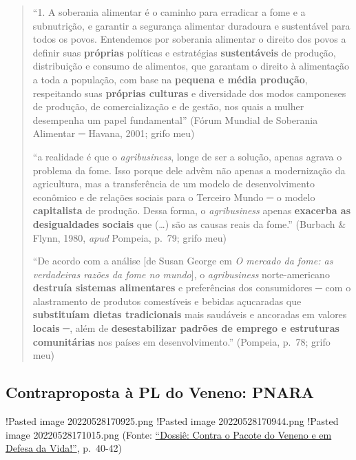 \begin{quote}
``1. A soberania alimentar é o caminho para erradicar a fome e a
subnutrição, e garantir a segurança alimentar duradoura e sustentável
para todos os povos. Entendemos por soberania alimentar o direito dos
povos a definir suas \textbf{próprias} políticas e estratégias
\textbf{sustentáveis} de produção, distribuição e consumo de alimentos,
que garantam o direito à alimentação a toda a população, com base na
\textbf{pequena e média produção}, respeitando suas
\textbf{próprias culturas} e diversidade dos modos camponeses de
produção, de comercialização e de gestão, nos quais a mulher desempenha
um papel fundamental'' (Fórum Mundial de Soberania Alimentar ─ Havana,
2001; grifo meu)

``a realidade é que o \textit{agribusiness}, longe de ser a solução,
apenas agrava o problema da fome. Isso porque dele advêm não apenas a
modernização da agricultura, mas a transferência de um modelo de
desenvolvimento econômico e de relações sociais para o Terceiro Mundo ─
o modelo \textbf{capitalista} de produção. Dessa forma, o
\textit{agribusiness} apenas \textbf{exacerba as desigualdades sociais}
que (\ldots) são as causas reais da fome.'' (Burbach \& Flynn, 1980,
\textit{apud} Pompeia, p.~79; grifo meu)

``De acordo com a análise {[}de Susan George em
\textit{O mercado da fome: as verdadeiras razões da fome no mundo}{]}, o
\textit{agribusiness} norte-americano
\textbf{destruía sistemas alimentares} e preferências dos consumidores ─
com o alastramento de produtos comestíveis e bebidas açucaradas que
\textbf{substituíam dietas tradicionais} mais saudáveis e ancoradas em
valores \textbf{locais} ─, além de
\textbf{desestabilizar padrões de emprego e estruturas comunitárias} nos
países em desenvolvimento.'' (Pompeia, p.~78; grifo meu)
\end{quote}

\hypertarget{contraproposta-uxe0-pl-do-veneno-pnara}{%
\subsection{Contraproposta à PL do Veneno:
PNARA}\label{contraproposta-uxe0-pl-do-veneno-pnara}}

!Pasted image 20220528170925.png !Pasted image 20220528170944.png
!Pasted image 20220528171015.png (Fonte:
\href{https://editora.redeunida.org.br/wp-content/uploads/2021/07/Livro-Dossie-–-Contra-o-Pacote-do-Veneno-e-em-Defesa-da-Vida.pdf}{``Dossiê:
Contra o Pacote do Veneno e em Defesa da Vida!''}, p.~40-42)

